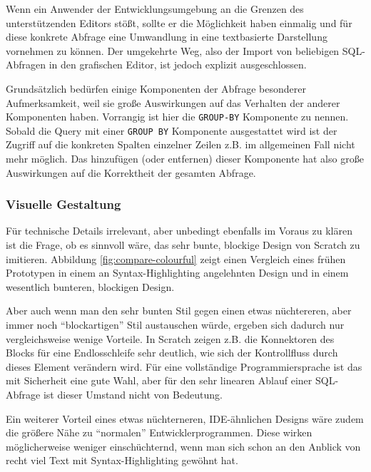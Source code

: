 Wenn ein Anwender der Entwicklungsumgebung an die Grenzen des unterstützenden Editors stößt, sollte er die Möglichkeit haben einmalig und für diese konkrete Abfrage eine Umwandlung in eine textbasierte Darstellung vornehmen zu können. Der umgekehrte Weg, also der Import von beliebigen SQL-Abfragen in den grafischen Editor, ist jedoch explizit ausgeschlossen.

Grundsätzlich bedürfen einige Komponenten der Abfrage besonderer Aufmerksamkeit, weil sie große Auswirkungen auf das Verhalten der anderer Komponenten haben. Vorrangig ist hier die \texttt{GROUP-BY} Komponente zu nennen. Sobald die Query mit einer \texttt{GROUP BY} Komponente ausgestattet wird ist der Zugriff auf die konkreten Spalten einzelner Zeilen z.B. im allgemeinen Fall nicht mehr möglich. Das hinzufügen (oder entfernen) dieser Komponente hat also große Auswirkungen auf die Korrektheit der gesamten Abfrage.

\subsubsection{Visuelle Gestaltung}

Für technische Details irrelevant, aber unbedingt ebenfalls im Voraus zu klären ist die Frage, ob es sinnvoll wäre, das sehr bunte, blockige Design von Scratch zu imitieren. Abbildung \ref{fig:compare-colourful} zeigt einen Vergleich eines frühen Prototypen in einem an Syntax-Highlighting angelehnten Design und in einem wesentlich bunteren, blockigen Design.


Aber auch wenn man den sehr bunten Stil gegen einen etwas nüchtereren, aber immer noch ``blockartigen'' Stil austauschen würde, ergeben sich dadurch nur vergleichsweise wenige Vorteile. In Scratch zeigen z.B. die Konnektoren des Blocks für eine Endlosschleife sehr deutlich, wie sich der Kontrollfluss durch dieses Element verändern wird. Für eine vollständige Programmiersprache ist das mit Sicherheit eine gute Wahl, aber für den sehr linearen Ablauf einer SQL-Abfrage ist dieser Umstand nicht von Bedeutung.

Ein weiterer Vorteil eines etwas nüchterneren, IDE-ähnlichen Designs wäre zudem die größere Nähe zu ``normalen'' Entwicklerprogrammen. Diese wirken möglicherweise weniger einschüchternd, wenn man sich schon an den Anblick von recht viel Text mit Syntax-Highlighting gewöhnt hat.


